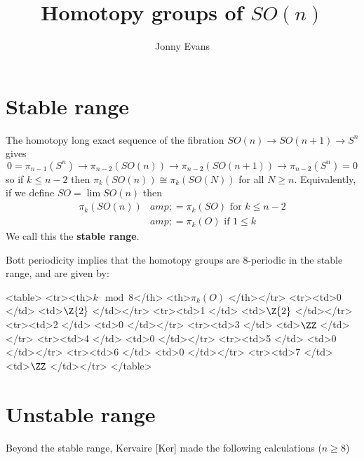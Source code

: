 \documentclass{amsart}
\title{Homotopy groups of $SO(n)$}
\author{Jonny Evans}
\begin{document}
\section{Stable range}

The homotopy long exact sequence of the fibration $SO(n)\to SO(n+1)\to S^n$ gives
\[0=\pi_{n-1}(S^n)\to\pi_{n-2}(SO(n))\to\pi_{n-2}(SO(n+1))\to \pi_{n-2}(S^n)=0\]
so if $k\leq n-2$ then $\pi_k(SO(n))\cong \pi_k(SO(N))$ for all $N\geq n$. Equivalently, if we define $SO=\lim SO(n)$ then
\[\begin{align}\pi_k(SO(n))&amp; = \pi_k(SO)\mbox{ for }k \leq n-2\\
&amp; = \pi_k(O)\mbox{ if }1 \leq k
\end{align}\]
We call this the {\bf stable range}.

Bott periodicity implies that the homotopy groups are 8-periodic in the stable range, and are given by:

      <table>
	<tr><th>$k \mod 8$</th> <th>$\pi_k(O)$  </th></tr>
	<tr><td>0        </td> <td>$\Z{2}$      </td></tr>
	<tr><td>1        </td> <td>$\Z{2}$      </td></tr>
	<tr><td>2        </td> <td>0            </td></tr>
	<tr><td>3        </td> <td>$\ZZ$        </td></tr>
	<tr><td>4        </td> <td>0            </td></tr>
	<tr><td>5        </td> <td>0            </td></tr>
	<tr><td>6        </td> <td>0            </td></tr>
	<tr><td>7        </td> <td>$\ZZ$        </td></tr>
      </table>

\section{Unstable range}

Beyond the stable range, Kervaire [Ker] made the following calculations ($n\geq 8$)
\end{document}
